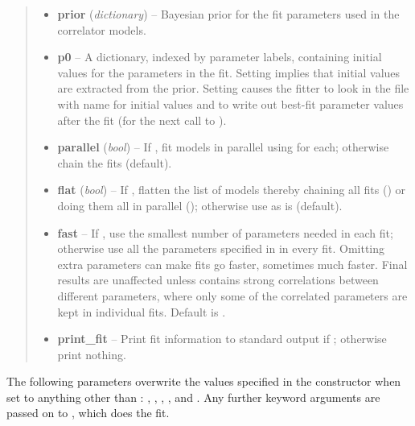 \documentclass[letterpaper,10pt,english]{sphinxmanual}
\begin{document}
\begin{fulllineitems}
\begin{fulllineitems}
\begin{quote}
\begin{description}
\begin{itemize}
\item {} 
\textbf{prior} (\emph{dictionary}) -- Bayesian prior for the fit parameters used in the 
correlator models.

\item {} 
\textbf{p0} -- A dictionary, indexed by parameter labels, containing 
initial values for the parameters in the fit. Setting
 implies that initial values are extracted from the
prior. Setting  causes the fitter to look in
the file with name  for initial values and to
write out best-fit parameter values after the fit (for the next
call to ).

\item {} 
\textbf{parallel} (\emph{bool}) -- If , fit models in parallel using 
for each; otherwise chain the fits (default).

\item {} 
\textbf{flat} (\emph{bool}) -- If , flatten the list of models thereby chaining
all fits () or doing them all in parallel
(); otherwise use  
as is (default).

\item {} 
\textbf{fast} -- If , use the smallest number of parameters needed
in each fit; otherwise use all the parameters specified in 
 in every fit. Omitting extra parameters can make 
fits go faster, sometimes much faster. Final results are 
unaffected unless  contains strong correlations between 
different parameters, where only some of the correlated parameters 
are kept in individual fits. Default is .

\item {} 
\textbf{print\_fit} -- Print fit information to standard output if 
; otherwise print nothing.

\end{itemize}

\end{description}\end{quote}

The following parameters overwrite the values specified in the
{\hyperref[corrfitter:corrfitter.CorrFitter]{}} constructor when set to anything other than :
, , , , and . Any
further keyword arguments are passed on to
, which does the fit.


\end{fulllineitems}
\end{fulllineitems}
\end{document}
